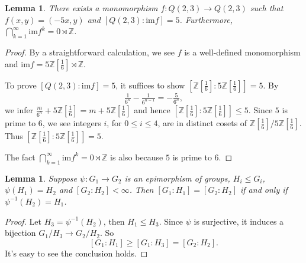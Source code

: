 \documentclass[12pt]{amsart}
\theoremstyle{plain}
\newtheorem{lemma}[theorem]{Lemma}
\theoremstyle{definition}
\theoremstyle{question}
\theoremstyle{remark}
\theoremstyle{assumption}
\numberwithin{equation}{section}
\theoremstyle{bigthm}
\begin{document}
\begin{lemma}\label{lem_Q(2,3)_hom}
There exists a monomorphism $f \colon  Q(2,3) \rightarrow Q(2,3)$ such that $f(x,y) = (-5x,y)$ and $[Q(2,3): \mathrm{im} f] =5$. Furthermore, $\bigcap_{k=1}^{\infty} \mathrm{im} f^{k} = 0 \rtimes \mathbb{Z}$.
\end{lemma}
\begin{proof}
By a straightforward calculation, we see $f$ is a well-defined monomorphism and $\mathrm{im} f = 5 \mathbb{Z}[\frac{1}{6}] \rtimes \mathbb{Z}$.

To prove $[Q(2,3): \mathrm{im} f] =5$, it suffices to show $[\mathbb{Z}[\frac{1}{6}]: 5 \mathbb{Z}[\frac{1}{6}]] =5$. By
\[
\tfrac{1}{6^{n}} - \tfrac{1}{6^{n-1}} = -\tfrac{5}{6^{n}},
\]
we infer $\tfrac{m}{6^{n}} + 5 \mathbb{Z}[\frac{1}{6}] = m + 5 \mathbb{Z}[\frac{1}{6}]$ and hence $[\mathbb{Z}[\frac{1}{6}]: 5 \mathbb{Z}[\frac{1}{6}]] \leq 5$. Since $5$ is prime to $6$, we see integers $i$, for $0 \leq i \leq 4$, are in distinct cosets of $\mathbb{Z}[\frac{1}{6}] / 5 \mathbb{Z}[\frac{1}{6}]$. Thus $[\mathbb{Z}[\frac{1}{6}]: 5 \mathbb{Z}[\frac{1}{6}]] =5$.

The fact $\bigcap_{k=1}^{\infty} \mathrm{im} f^{k} = 0 \rtimes \mathbb{Z}$ is also because $5$ is prime to $6$.
\end{proof}

\begin{lemma}\label{lem_coset_index}
Suppose $\psi \colon G_{1} \rightarrow G_{2}$ is an epimorphism of groups, $H_{i} \le G_{i}$, $\psi (H_{1}) = H_{2}$ and $[G_{2} : H_{2}] < \infty$. Then $[G_{1} : H_{1}] = [G_{2} : H_{2}]$ if and only if $\psi^{-1} (H_{2}) = H_{1}$.
\end{lemma}
\begin{proof}
Let $H_{3} = \psi^{-1} (H_{2})$, then $H_{1} \le H_{3}$. Since $\psi$ is surjective, it induces a bijection $G_{1} / H_{3} \rightarrow G_{2} / H_{2}$. So
\[
[G_{1} : H_{1}] \ge [G_{1} : H_{3}] = [G_{2} : H_{2}].
\]
It's easy to see the conclusion holds.
\end{proof}
\end{document}
